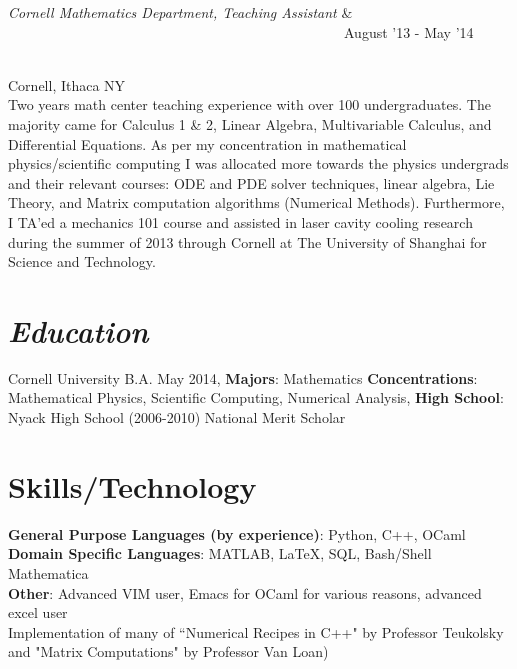 \documentclass{res}
\begin{document}
{\begin{resume}
\begin{ncolumn}{2}
{\it Cornell Mathematics Department, Teaching Assistant} & ~~~~~~~~~~~~~~~~~~~~~~~~~~~~~~~~~~~~~~~~~~~~~~~~August '13 - May '14
\end{ncolumn}\\
Cornell, Ithaca NY\\
Two years math center teaching experience with over 100 undergraduates. The majority came for Calculus 1 \& 2, Linear Algebra, Multivariable Calculus, and Differential Equations. As per my concentration in mathematical physics/scientific computing I was allocated more towards the physics undergrads and their relevant courses: ODE and PDE solver techniques, linear algebra, Lie Theory, and Matrix computation algorithms (Numerical Methods). Furthermore, I TA'ed a mechanics 101 course and assisted in laser cavity cooling research during the summer of 2013 through Cornell at The University of Shanghai for Science and Technology.

\section{\sl\bf  Education}
Cornell University B.A. May 2014,
\textbf{Majors}: Mathematics \textbf{Concentrations}: Mathematical
Physics, Scientific Computing, Numerical Analysis, \textbf{High School}: Nyack High School (2006-2010) National Merit Scholar

\section{\textbf{Skills/Technology}}
{\bf General Purpose Languages (by experience)}: Python, C++, OCaml\\
{\bf Domain Specific Languages}: MATLAB, LaTeX, SQL, Bash/Shell Mathematica\\
{\bf Other}: Advanced VIM user, Emacs for OCaml for various reasons, advanced
excel user\\
Implementation of many of ``Numerical Recipes in C++" by Professor Teukolsky and "Matrix Computations" by Professor Van Loan)


\end{resume}}
\end{document}
